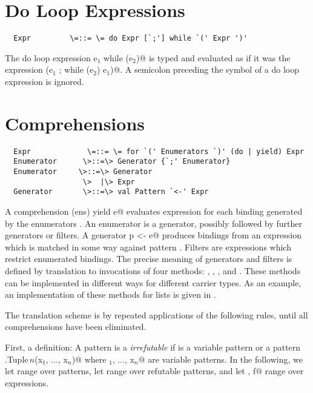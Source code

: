 \documentclass[11pt]{report}
\begin{document}
\section{Do Loop Expressions}

\syntax\begin{verbatim}
  Expr	       \=::= \= do Expr [`;'] while `(' Expr ')'
\end{verbatim}

The do loop expression \verb@do e$_1$ while (e$_2$)@ is typed and
evaluated as if it was the expression \verb@(e$_1$ ; while (e$_2$) e$_1$)@.
A semicolon preceding the \verb@while@ symbol of a do loop expression is ignored.

\section{Comprehensions}

\syntax\begin{verbatim}
  Expr	           \=::= \= for `(' Enumerators `)' (do | yield) Expr
  Enumerator      \>::=\> Generator {`;' Enumerator}
  Enumerator     \>::=\> Generator
                  \>  |\> Expr
  Generator       \>::=\> val Pattern `<-' Expr
\end{verbatim}

A comprehension \verb@for (ens) yield e@ evaluates expression \verb@e@ for each
binding generated by the enumerators \verb@ens@. An enumerator is a generator,
possibly followed by further generators or filters.  A generator
\verb@val p <- e@ produces bindings from an expression \verb@e@ which is
matched in some way against pattern \verb@p@. Filters are expressions which
restrict enumerated bindings. The precise meaning of generators and
filters is defined by translation to invocations of four methods:
\verb@map@, \verb@filter@, \verb@flatMap@, and \verb@foreach@. These
methods can be implemented in different ways for different carrier
types.  As an example, an implementation of these methods for lists is
given in .

The translation scheme is by repeated applications of the following
rules, until all comprehensions have been eliminated.

First, a definition: A pattern \verb@p@ is a {\em irrefutable} if \verb@p@ is a
variable pattern or a pattern \verb@scala.Tuple$\,n$(x$_1$, ..., x$_n$)@ where
\verb@x$_1$, ..., x$_n$@ are variable patterns. 
In the following, we let \verb@p@ range over patterns, 
let \verb@q@ range over refutable patterns, and
let \verb@e, f@ range over expressions.
\end{document}
